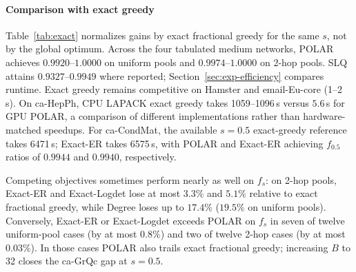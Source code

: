 \documentclass[conference]{IEEEtran}
\theoremstyle{definition}
\newcommand{\POLAR}{\textsc{POLAR}}
\begin{document}
\paragraph{Comparison with exact greedy}
Table~\ref{tab:exact} normalizes gains by exact fractional greedy for
the same $s$, not by the global optimum. Across the four tabulated
medium networks, \POLAR{} achieves $0.9920$--$1.0000$ on uniform pools
and $0.9974$--$1.0000$ on 2-hop pools. SLQ attains $0.9327$--$0.9949$
where reported; Section~\ref{sec:exp-efficiency} compares runtime. Exact greedy
remains competitive on Hamster and email-Eu-core (1--2\,s). On ca-HepPh,
CPU LAPACK exact greedy takes 1059--1096\,s versus $5.6$\,s for GPU
\POLAR{}, a comparison of different implementations rather than
hardware-matched speedups. For ca-CondMat, the available $s=0.5$
exact-greedy reference takes 6471\,s; Exact-ER takes 6575\,s, with
\POLAR{} and Exact-ER achieving $f_{0.5}$ ratios of $0.9944$ and
$0.9940$, respectively.

Competing objectives sometimes perform nearly as well on $f_s$: on
2-hop pools, Exact-ER and Exact-Logdet lose at most $3.3\%$ and $5.1\%$
relative to exact fractional greedy, while Degree loses up to $17.4\%$
($19.5\%$ on uniform pools). Conversely, Exact-ER or Exact-Logdet exceeds
\POLAR{} on $f_s$ in seven of twelve uniform-pool cases (by at most
$0.8\%$) and two of twelve 2-hop cases (by at most $0.03\%$). In those cases \POLAR{} also trails exact fractional greedy;
increasing $B$ to 32 closes the ca-GrQc gap at $s=0.5$.
\end{document}
